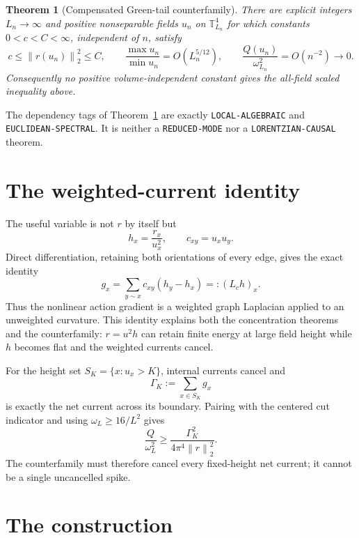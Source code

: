 \documentclass[11pt]{article}
\newtheorem{theorem}{Theorem}[section]
\theoremstyle{remark}
\newcommand{\T}{\mathbb T}
\newcommand{\norm}[1]{\left\lVert#1\right\rVert}
\begin{document}
\begin{theorem}[Compensated Green-tail counterfamily]
\label{thm:main}
There are explicit integers \(L_n\to\infty\) and positive nonseparable
fields \(u_n\) on \(\T_{L_n}^4\) for which constants \(0<c<C<\infty\),
independent of \(n\), satisfy
\[
 c\leq\norm{r(u_n)}_2^2\leq C,
 \qquad \frac{\max u_n}{\min u_n}=O(L_n^{5/12}),
 \qquad \frac{Q(u_n)}{\omega_{L_n}^2}=O(n^{-2})\longrightarrow0.
\]
Consequently no positive volume-independent constant gives the all-field
scaled inequality above.
\end{theorem}

The dependency tags of Theorem~\ref{thm:main} are exactly
\texttt{LOCAL-ALGEBRAIC} and \texttt{EUCLIDEAN-SPECTRAL}.  It is neither a
\texttt{REDUCED-MODE} nor a \texttt{LORENTZIAN-CAUSAL} theorem.

\section{The weighted-current identity}

The useful variable is not \(r\) by itself but
\[
 h_x=\frac{r_x}{u_x^2},\qquad c_{xy}=u_xu_y.
\]
Direct differentiation, retaining both orientations of every edge, gives
the exact identity
\begin{equation}
 g_x=\sum_{y\sim x}c_{xy}(h_y-h_x)=:(L_ch)_x.
 \label{eq:weighted-current}
\end{equation}
Thus the nonlinear action gradient is a weighted graph Laplacian applied to
an unweighted curvature.  This identity explains both the concentration
theorems and the counterfamily: \(r=u^2h\) can retain finite energy at large
field height while \(h\) becomes flat and the weighted currents cancel.

For the height set \(S_K=\{x:u_x>K\}\), internal currents cancel and
\[
 \Gamma_K:=\sum_{x\in S_K}g_x
\]
is exactly the net current across its boundary.  Pairing with the centered
cut indicator and using \(\omega_L\geq16/L^2\) gives
\begin{equation}
 \frac{Q}{\omega_L^2}\geq
 \frac{\Gamma_K^2}{4\pi^4\norm{r}_2^2}.
 \label{eq:cut}
\end{equation}
The counterfamily must therefore cancel every fixed-height net current; it
cannot be a single uncancelled spike.

\section{The construction}
\end{document}
